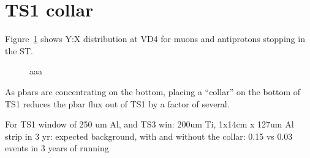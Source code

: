 \section{TS1 collar}

Figure~\ref{figure:vd4_muons_vs_pbars_1037} shows Y:X distribution at VD4 for
muons and antiprotons stopping in the ST.

\begin{figure}[H]
  \caption{
    \label{figure:vd4_muons_vs_pbars_1037}
    aaa
  }
\end{figure}

As pbars are concentrating on the bottom, placing a ``collar'' on the bottom of TS1 
reduces the pbar flux out of TS1 by a factor of several.

For TS1 window of 250 um Al, and TS3 win: 200um Ti, 1x14cm x 127um Al strip in 3 yr:
expected background, with and without the collar: 0.15 vs 0.03 events in 3 years of running

